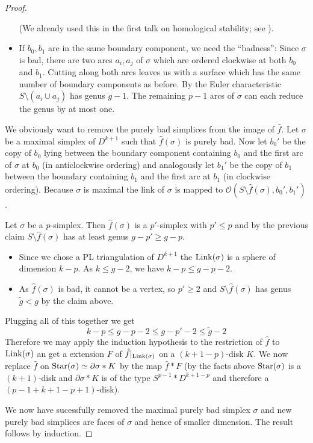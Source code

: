 \begin{proof}
\begin{itemize}[itemsep=0pt]
		(We already used this in the first talk on homological stability; see \textcite[Prop.2.2]{wahlHomological}).
		\item If $b_0,b_1$ are in the same boundary component, we need the \enquote{badness}:
		Since $\sigma$ is bad, there are two arcs $a_i, a_j$ of $\sigma$ which are ordered clockwise at both $b_0$ and $b_1$.
		Cutting along both arcs leaves us with a surface which has the same number of boundary components as before.
		By the Euler characteristic $S \setminus (a_i \cup a_j)$ has genus $g-1$.
		The remaining $p-1$ arcs of $\sigma$ can each reduce the genus by at most one.
	\end{itemize}
	We obviously want to remove the purely bad simplices from the image of $\hat{f}$.
	Let $\sigma$ be a maximal simplex of $D^{k+1}$ such that $\hat{f}(\sigma)$ is purely bad.
	Now let $b_0'$ be the copy of $b_0$ lying between the boundary component containing $b_0$ and the first arc of $\sigma$ at $b_0$ (in anticlockwise ordering) and analogously let $b_1'$ be the copy of $b_1$ between the boundary containing $b_1$ and the first arc at $b_1$ (in clockwise ordering).
	Because $\sigma$ is maximal the link of $\sigma$ is mapped to $\mathcal{O}(S\setminus \hat{f}(\sigma),b_0',b_1')$.
	
	Let $\sigma$ be a $p$-simplex.
	Then $\hat{f}(\sigma)$ is a $p'$-simplex with $p' \le p$ and by the previous claim $S \setminus \hat{f}(\sigma)$ has at least genus $g- p' \ge g- p$.
	\begin{itemize}[itemsep=0pt]
		\item Since we chose a PL triangulation of $D^{k+1}$ the $\operatorname{Link}(\sigma)$ is a sphere of dimension $k-p$.
		As $k \le g-2$, we have $k-p \le g -p -2$.
		\item As $\hat{f}(\sigma)$ is bad, it cannot be a vertex, so $p' \ge 2$ and $S \setminus \hat{f}(\sigma)$ has genus $\tilde{g} < g$ by the claim above.
	\end{itemize}
	Plugging all of this together we get
	\[
		k-p \le g- p -2 \le g- p' -2 \le \tilde{g} -2
	\]
	Therefore we may apply the induction hypothesis to the restriction of $\hat{f}$ to $\operatorname{Link}(\sigma)$ an get a extension $F$ of $\hat{f}|_{\operatorname{Link}(\sigma)}$ on a $(k+1-p)$-disk $K$.
	We now replace $\hat{f}$ on $\operatorname{Star}(\sigma) \simeq \partial \sigma * K$ by the map $\hat{f} * F$ (by the facts above $\operatorname{Star}(\sigma)$ is a $(k+1)$-disk and $\partial \sigma * K$ is of the type $S^{p-1} * D^{k+1-p}$ and therefore a $(p-1+k+1-p+1)$-disk).
	
	We now have sucessfully removed the maximal purely bad simplex $\sigma$ and new purely bad simplices are faces of $\sigma$ and hence of smaller dimension.
	The result follows by induction.
\end{proof}